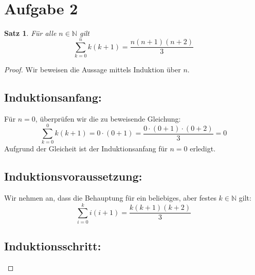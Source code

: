 \documentclass{article}
\newtheorem*{theorem}{Satz}
\begin{document}

\section*{Aufgabe 2}

\begin{theorem}
	Für alle \( n \in \mathbb{N} \) gilt \[ \sum_{k=0}^{n} k(k+1) = \frac{n(n+1)(n+2)}{3}\]
\end{theorem}

\begin{proof} Wir beweisen die Aussage mittels Induktion über \( n \).
	\subsection*{Induktionsanfang:}

	Für \( n = 0 \), überprüfen wir die zu beweisende Gleichung:
	\[
		\sum_{k=0}^{0} k(k + 1) = 0 \cdot (0 + 1) =	\frac{0 \cdot (0 + 1) \cdot (0 + 2)}{3} = 0
	\]
	Aufgrund der Gleicheit ist der Induktionsanfang für \( n = 0 \) erledigt.

	\subsection*{Induktionsvoraussetzung:}

	Wir nehmen an, dass die Behauptung für ein beliebiges, aber festes \( k \in \mathbb{N} \) gilt:
	\[
		\sum_{i=0}^{k} i(i + 1) = \frac{k(k + 1)(k + 2)}{3}
	\]

	\subsection*{Induktionsschritt:}


\end{proof}
\end{document}
